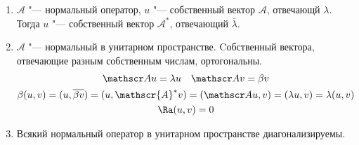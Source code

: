 \begin{conseq}
	\begin{enumerate}
	\item
		$\mathscr A$ "--- нормальный оператор, $u$ "--- собственный вектор $\mathscr A$, отвечающй  $\lambda$.
		Тогда $u$ "--- собственный вектор $\mathscr{A}^*$, отвечающий $\overline{\lambda}$.
	
	\item
		$\mathscr A$ "--- нормальный в унитарном пространстве.
		Cобственный вектора, отвечающие разным собственным числам, ортогональны.
		\begin{gather*}
			\mathscr Au = \lambda u \quad \mathscr Av = \beta v \\
			\beta(u, v) = (u, \overline{\beta v}) = (u, \mathscr{A}^*v) = (\mathscr Au, v) = (\lambda u, v) = \lambda (u, v) \\
			\Ra (u, v) = 0
		\end{gather*}
	
	\item
		Всякий нормальный оператор в унитарном пространстве диагонализируемы.
	\end{enumerate}
\end{conseq}


